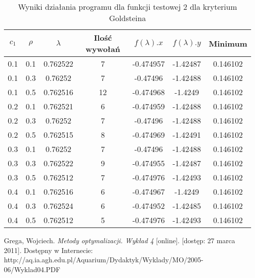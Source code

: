 \documentclass{classrep}
\begin{document}
\begin{table}
  \centering
  \caption{Wyniki działania programu dla funkcji testowej 2 dla kryterium Goldsteina}
  \label{goldstein2}
  \begin{tabular}{|c|c|c|c|c|c|c|}
    \hline
    $c_1$ & $\rho$ & $\lambda$ & Ilość wywołań & $f(\lambda).x$ & $f(\lambda).y$ & Minimum \\
    \hline
    0.1 & 0.1 & 0.762522 & 7 & -0.474957 & -1.42487 & 0.146102 \\
    0.1 & 0.3 & 0.76252 & 7 & -0.47496 & -1.42488 & 0.146102 \\
    0.1 & 0.5 & 0.762516 & 12 & -0.474968 & -1.4249 & 0.146102 \\
    0.2 & 0.1 & 0.762521 & 6 & -0.474959 & -1.42488 & 0.146102 \\
    0.2 & 0.3 & 0.76252 & 7 & -0.47496 & -1.42488 & 0.146102 \\
    0.2 & 0.5 & 0.762515 & 8 & -0.474969 & -1.42491 & 0.146102 \\
    0.3 & 0.1 & 0.76252 & 7 & -0.47496 & -1.42488 & 0.146102 \\
    0.3 & 0.3 & 0.762522 & 9 & -0.474955 & -1.42487 & 0.146102 \\
    0.3 & 0.5 & 0.762512 & 7 & -0.474976 & -1.42493 & 0.146102 \\
    0.4 & 0.1 & 0.762516 & 6 & -0.474967 & -1.4249 & 0.146102 \\
    0.4 & 0.3 & 0.762524 & 6 & -0.474952 & -1.42485 & 0.146102 \\
    0.4 & 0.5 & 0.762512 & 5 & -0.474976 & -1.42493 & 0.146102 \\
    \hline
  \end{tabular}
\end{table}

\begin{thebibliography}{99}
Grega, Wojciech. \textit{Metody optymalizacji. Wykład 4} [online]. [dostęp: 27
marca 2011]. Dostępny w Internecie:
http://aq.ia.agh.edu.pl/Aquarium/Dydaktyk/Wyklady/MO/2005-06/Wyklad04.PDF
\end{thebibliography}
\end{document}
